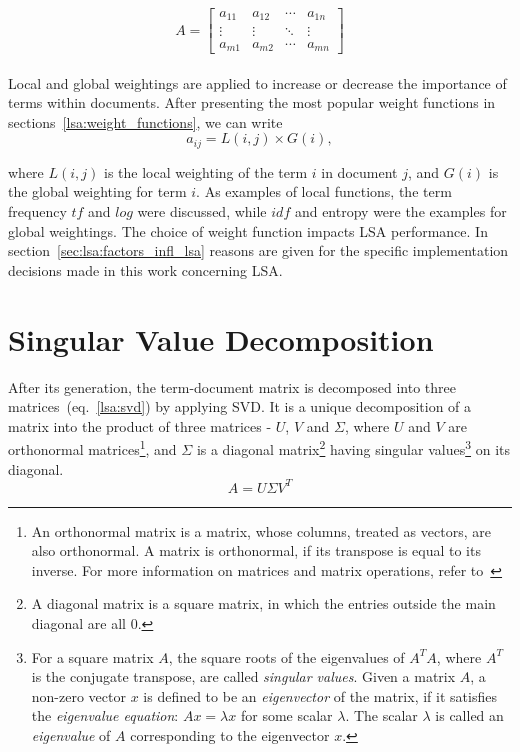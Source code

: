%
%
\begin{equation}
A=
\begin{bmatrix}
\label{lsa:sparse_matrix_A}
 a_{11}& a_{12}& \cdots& a_{1n} \\
 \vdots& \vdots& \ddots& \vdots \\ 
 a_{m1}& a_{m2}& \cdots& a_{mn}
\end{bmatrix}
\end{equation}\\

Local and global weightings are applied to increase or decrease the importance of terms within documents. After presenting the most popular weight functions in sections~\ref{lsa:weight_functions}, we can write
%
%
\begin{equation}
\label{lsa:global_local_weighting}
a_{ij}=L(i,j) \times G(i),
\end{equation}

where $L(i,j)$ is the local weighting of the term $i$ in document $j$, and $G(i)$ is the global weighting for term $i$. As examples of local functions, the term frequency $tf$ and $log$ were discussed, while $idf$ and entropy were the examples for global weightings. The choice of weight function impacts \gls{LSA} performance. In section~\ref{sec:lsa:factors_infl_lsa} reasons are given for the specific implementation decisions made in this work concerning \gls{LSA}. \\

\section{Singular Value Decomposition}
\label{sec:lsa:svd}

After its generation, the term-document matrix is decomposed into three matrices~(eq.~\ref{lsa:svd}) by applying \gls{SVD}. It is a unique decomposition of a matrix into the product of three matrices - $U$, $V$ and $\Sigma$, where $U$ and $V$ are orthonormal matrices\footnote{An orthonormal matrix is a matrix, whose columns, treated as 
 vectors, are also orthonormal. A matrix is orthonormal, if its transpose is equal to its inverse. For more information on matrices and matrix operations, refer to~\cite{MatrixCompGolub96}}, and $ \Sigma $ is a diagonal matrix\footnote{A diagonal matrix is a square matrix, in which the entries outside the main diagonal are all $0$.} having singular values\footnote{For a square matrix $A$, the square roots of the eigenvalues of $A^{T}A$, where $A^{T}$ is the conjugate transpose, are called \textit{singular values}. Given a matrix $A$, a non-zero vector $x$ is defined to be an \textit{eigenvector} of the matrix, if it satisfies the \textit{eigenvalue equation}: $Ax=\lambda x$ for some scalar $ \lambda $. The scalar $ \lambda $ is called an \textit{eigenvalue} of $A$ corresponding to the eigenvector $x$.\cite{MatrixCompGolub96}} on its diagonal.\\
%
%
\begin{equation}
\label{lsa:svd}
A=U \Sigma V^{T}
\end{equation}

